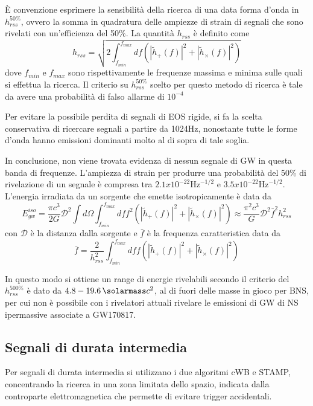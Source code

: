 È convenzione esprimere la sensibilità della ricerca di una data forma d'onda in $h_{rss}^{50\%}$, ovvero la somma in quadratura delle ampiezze di strain di segnali che sono rivelati con un'efficienza del 50\%. La quantità $h_{rss}$ è definito come
\begin{equation}
	h_{rss} = \sqrt{2\int_{f_{min}}^{f_{max}}df(|\tilde{h}_+(f)|^2 + |\tilde{h}_\times(f)|^2 )}
\end{equation}
dove $f_{min}$ e $f_{max}$ sono rispettivamente le frequenze massima e minima sulle quali si effettua la ricerca. 
Il criterio su $h_{rss}^{50\%}$ scelto per questo metodo di ricerca è tale da avere una probabilità di falso allarme di $10^{-4}$

Per evitare la possibile perdita di segnali di EOS rigide, si fa la scelta conservativa di ricercare segnali a partire da 1024Hz, nonostante tutte le forme d'onda hanno emissioni dominanti molto al di sopra di tale soglia.

In conclusione, non viene trovata evidenza di nessun segnale di GW in questa banda di frequenze.
L'ampiezza di strain per produrre una probabilità del 50\% di rivelazione di un segnale è compresa tra $2.1 x 10^{-22} \text{Hz}^{-1/2}$ e $3.5 x 10^{-22} \text{Hz}^{-1/2}$. L'energia irradiata da un sorgente che emette isotropicamente è data da 
\begin{equation}
	E_{gw}^{iso} = \frac{\pi c^3}{2G}\mathcal{D}^2\int d\Omega \int_{f_{min}}^{f_{max}}dff^2(|\tilde{h}_+(f)|^2 + |\tilde{h}_\times(f)|^2 ) \approx \frac{\pi^2 c^3}{G}\mathcal{D}^2\bar{f}^2h_{rss}^2
\end{equation}
con $\mathcal{D}$ è la distanza dalla sorgente e $\bar{f}$ è la frequenza caratteristica data da 
\begin{equation}
	\bar{f} = \frac{2}{h_{rss}^2}\int_{f_{min}}^{f_{max}}dff(|\tilde{h}_+(f)|^2 + |\tilde{h}_\times(f)|^2 )
\end{equation}

In questo modo si ottiene un range di energie rivelabili secondo il criterio del $h_{rss}^{500\%}$ è dato da $4.8-\SI{19.6}{\solarmass}c^2$, al di fuori delle masse in gioco per BNS, per cui non è possibile con i rivelatori attuali rivelare le emissioni di GW di NS ipermassive associate a GW170817.
\subsection{Segnali di durata intermedia}
Per segnali di durata intermedia si utilizzano i due algoritmi cWB e STAMP, concentrando la ricerca in una zona limitata dello spazio, indicata dalla controparte elettromagnetica che permette di evitare trigger accidentali.

